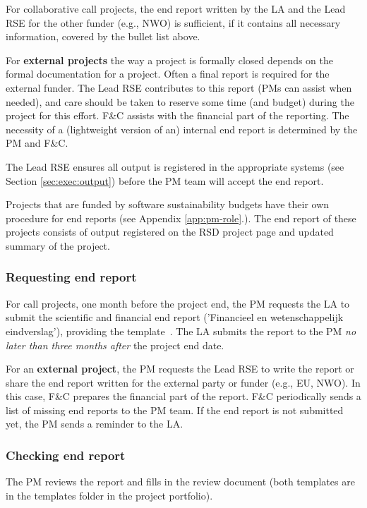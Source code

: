 For collaborative call projects, the end report written by the LA and the Lead RSE for the other funder (e.g., NWO) is
sufficient, if it contains all necessary information, covered by the bullet list above.

For \textbf{external projects} the way a project is formally closed depends on the formal documentation for a project.
Often a final report is required for the external funder. The Lead RSE contributes to this report (PMs can assist when
needed), and care should be taken to reserve some time (and budget) during the project for this effort. F\&C assists
with the financial part of the reporting. The necessity of a (lightweight version of an) internal end report is
determined by the PM and F\&C.

The Lead RSE ensures all output is registered in the appropriate systems (see Section \ref{sec:exec:output}) before the
PM team will accept the end report.

Projects that are funded by software sustainability budgets have their own procedure for end reports (see Appendix
\ref{app:pm-role}.). The end report of these projects consists of output registered on the RSD project page and
updated summary of the project.



\subsubsection{Requesting end report}
For call projects, one month before the project end, the PM requests the LA to submit the scientific and financial end
report ('Financieel en wetenschappelijk eindverslag'), providing the
template~\cite{proj-templates}. The LA submits the report to the PM \textit{no later than three months after} the project end date.


For an \textbf{external project}, the PM requests the Lead RSE to write the report or share the end report written for
the external party or funder (e.g., EU, NWO). In this case, F\&C prepares the financial part of the report. F\&C
periodically sends a list of missing end reports to the PM team. If the end report is not submitted yet, the PM sends a
reminder to the LA.

\subsubsection{Checking end report}
The PM reviews the report and fills in the review document (both templates are in the templates folder in the project
portfolio).

